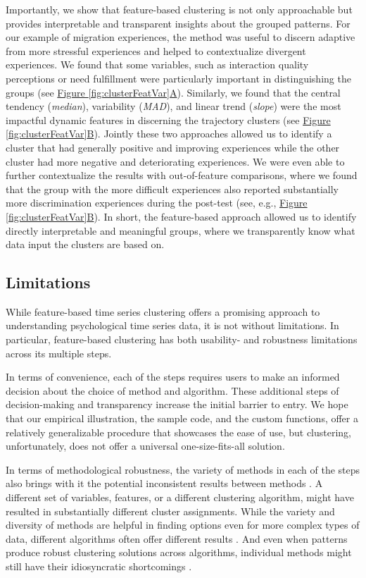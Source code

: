 \documentclass[man, 12pt, a4paper, mask, floatsintext]{apa7}
\theoremstyle{break}
\theoremstyle{plain}
\newcommand{\fgrref}[2][]{\hyperref[#2]{Figure \ref*{#2}#1}}
\begin{document}
Importantly, we show that feature-based clustering is not only approachable but provides interpretable and transparent insights about the grouped patterns. For our example of migration experiences, the method was useful to discern adaptive from more stressful experiences and helped to contextualize divergent experiences. We found that some variables, such as interaction quality perceptions or need fulfillment were particularly important in distinguishing the groups (see \fgrref[A]{fig:clusterFeatVar}). Similarly, we found that the central tendency (\textit{median}), variability (\textit{MAD}), and linear trend (\textit{slope}) were the most impactful dynamic features in discerning the trajectory clusters (see \fgrref[B]{fig:clusterFeatVar}). Jointly these two approaches allowed us to identify a cluster that had generally positive and improving experiences while the other cluster had more negative and deteriorating experiences. We were even able to further contextualize the results with out-of-feature comparisons, where we found that the group with the more difficult experiences also reported substantially more discrimination experiences during the post-test (see, e.g., \fgrref[B]{fig:clusterFeatVar}). In short, the feature-based approach allowed us to identify directly interpretable and meaningful groups, where we transparently know what data input the clusters are based on.

\subsection{Limitations}
While feature-based time series clustering offers a promising approach to understanding psychological time series data, it is not without limitations. In particular, feature-based clustering has both usability- and robustness limitations across its multiple steps. 

In terms of convenience, each of the steps requires users to make an informed decision about the choice of method and algorithm. These additional steps of decision-making and transparency increase the initial barrier to entry. We hope that our empirical illustration, the sample code, and the custom functions, offer a relatively generalizable procedure that showcases the ease of use, but clustering, unfortunately, does not offer a universal one-size-fits-all solution. 

In terms of methodological robustness, the variety of methods in each of the steps also brings with it the potential inconsistent results between methods \citep[e.g.,][]{bastiaansen2019}. A different set of variables, features, or a different clustering algorithm, might have resulted in substantially different cluster assignments. While the variety and diversity of methods are helpful in finding options even for more complex types of data, different algorithms often offer different results \citep[e.g.,][]{keogh2005}. And even when patterns produce robust clustering solutions across algorithms, individual methods might still have their idiosyncratic shortcomings \citep{xu2015}. 
\end{document}
